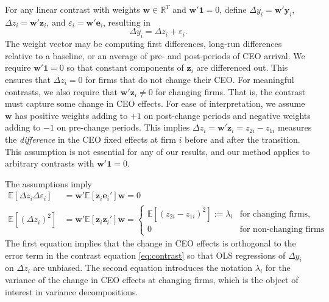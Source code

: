 \documentclass[11pt,a4paper]{article}
\begin{document}
For any linear contrast with weights $\mathbf w\in\mathbb R^T$ and $\mathbf w'\mathbf 1=0$, define $\Delta y_i=\mathbf w'\mathbf y_i$, $\Delta z_i=\mathbf w'\mathbf z_i$, and $\varepsilon_i=\mathbf w'\mathbf e_i$, resulting in
\begin{equation}\label{eq:contrast}
\Delta y_i = \Delta z_i + \varepsilon_i.
\end{equation}
The weight vector may be computing first differences, long-run differences relative to a baseline, or an average of pre- and post-periods of CEO arrival. We require $\mathbf w'\mathbf 1=0$ so that constant components of $\mathbf z_i$ are differenced out. This ensures that $\Delta z_i=0$ for firms that do not change their CEO. For meaningful contrasts, we also require that $\mathbf w'\mathbf z_i\neq 0$ for changing firms. That is, the contrast must capture some change in CEO effects. For ease of interpretation, we assume $\mathbf w$ has positive weights adding to $+1$ on post-change periods and negative weights adding to $-1$ on pre-change periods. This implies $\Delta z_i = \mathbf w'\mathbf z_i=z_{2i} - z_{1i}$ measures the \emph{difference} in the CEO fixed effects at firm $i$ before and after the transition. This assumption is not essential for any of our results, and our method applies to arbitrary contrasts with $\mathbf w'\mathbf 1=0$.

The assumptions imply
\begin{align}
\mathbb E[\Delta z_i\Delta \varepsilon_i] &= \mathbf w'\mathbb E[\mathbf z_i\mathbf e_i']\mathbf w = 0\\
\mathbb E[(\Delta z_i)^2] &= \mathbf w'\mathbb E[\mathbf z_i\mathbf z_i']\mathbf w = 
\begin{cases}
  \mathbb E[(z_{2i} - z_{1i})^2] := \lambda_i & \text{for changing firms},\\
  0 & \text{for non-changing firms}
\end{cases}
\end{align}
The first equation implies that the change in CEO effects is orthogonal to the error term in the contrast equation \eqref{eq:contrast} so that OLS regressions of $\Delta y_i$ on $\Delta z_i$ are unbiased. The second equation introduces the notation $\lambda_i$ for the variance of the change in CEO effects at changing firms, which is the object of interest in variance decompositions.
\end{document}
